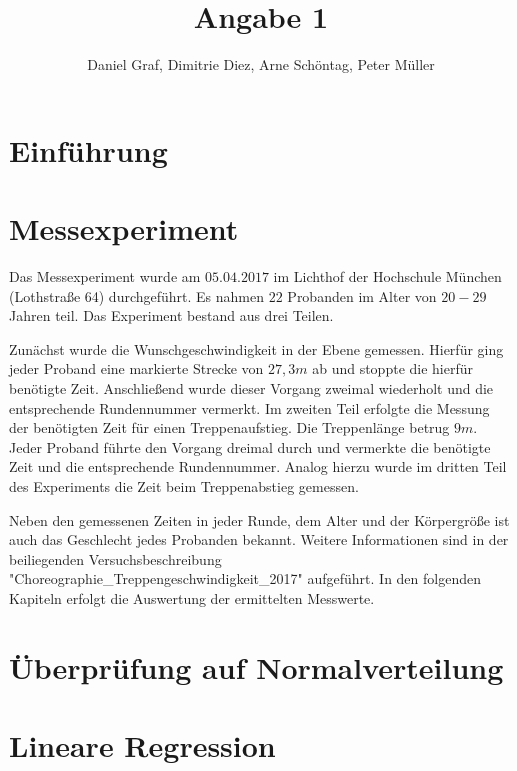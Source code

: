 
 
\title{Angabe 1}
\providecommand{\subtitle}[1]{}
\subtitle{Untertitel}
\author{Daniel Graf, Dimitrie Diez, Arne Schöntag, Peter Müller}
\date{}


\maketitle


\tableofcontents

\section{Einführung}


\section{Messexperiment}

Das Messexperiment wurde am $05.04.2017$ im Lichthof der Hochschule München (Lothstraße 64) durchgeführt. Es nahmen $22$ Probanden im Alter von $20-29$ Jahren teil. Das Experiment bestand aus drei Teilen. 

Zunächst wurde die Wunschgeschwindigkeit in der Ebene gemessen. Hierfür ging jeder Proband eine markierte Strecke von $27,3m$ ab und stoppte die hierfür benötigte Zeit. Anschließend wurde dieser Vorgang zweimal wiederholt und die entsprechende Rundennummer vermerkt. Im zweiten Teil erfolgte die Messung der benötigten Zeit für einen Treppenaufstieg. Die Treppenlänge betrug $9m$. Jeder Proband führte den Vorgang dreimal durch und vermerkte die benötigte Zeit und die entsprechende Rundennummer. Analog hierzu wurde im dritten Teil des Experiments die Zeit beim Treppenabstieg gemessen. 

Neben den gemessenen Zeiten in jeder Runde, dem Alter und der Körpergröße ist auch das Geschlecht jedes Probanden bekannt. Weitere Informationen sind in der beiliegenden Versuchsbeschreibung "Choreographie\_Treppengeschwindigkeit\_2017" aufgeführt. In den folgenden Kapiteln erfolgt die Auswertung der ermittelten Messwerte.

\section{Überprüfung auf Normalverteilung}

\section{Lineare Regression}

